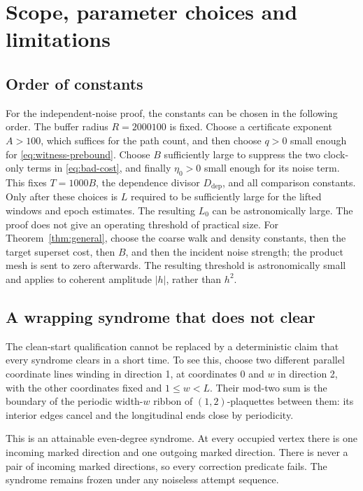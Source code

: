 \section{Scope, parameter choices and limitations}\label{sec:discussion}

\subsection{Order of constants}

For the independent-noise proof, the constants can be chosen in the following order.
The buffer radius \(R=2000100\) is fixed. Choose a certificate
exponent \(A>100\), which suffices for the path count, and then
choose \(q>0\) small enough for
\eqref{eq:witness-prebound}. Choose \(B\) sufficiently large to
suppress the two clock-only terms in
\eqref{eq:bad-cost}, and finally \(\eta_0>0\) small enough for its
noise term. This fixes \(T=1000B\), the dependence divisor \(D_{\mathrm{dep}}\),
and all comparison constants. Only after these choices is \(L\)
required to be sufficiently large for the lifted windows and
epoch estimates. The resulting \(L_0\) can be astronomically large.
The proof does not give an operating threshold of practical size.
For Theorem~\ref{thm:general}, choose the coarse walk and density
constants, then the target superset cost, then \(B\), and then the
incident noise strength; the product mesh is sent to zero afterwards.
The resulting threshold is astronomically small and applies to
coherent amplitude \(|h|\), rather than \(h^2\).

\subsection{A wrapping syndrome that does not clear}

The clean-start qualification cannot be replaced by a deterministic
claim that every syndrome clears in a short time. To see this,
choose two different parallel coordinate lines winding in direction
1, at coordinates 0 and \(w\) in direction 2, with the other
coordinates fixed and \(1\le w<L\). Their mod-two sum is the
boundary of the periodic width-\(w\) ribbon of \((1,2)\)-plaquettes
between them: its interior edges cancel and the longitudinal ends
close by periodicity.

This is an attainable even-degree syndrome. At every occupied
vertex there is one incoming marked direction and one outgoing
marked direction. There is never a pair of incoming marked
directions, so every correction predicate fails. The syndrome
remains frozen under any noiseless attempt sequence.

